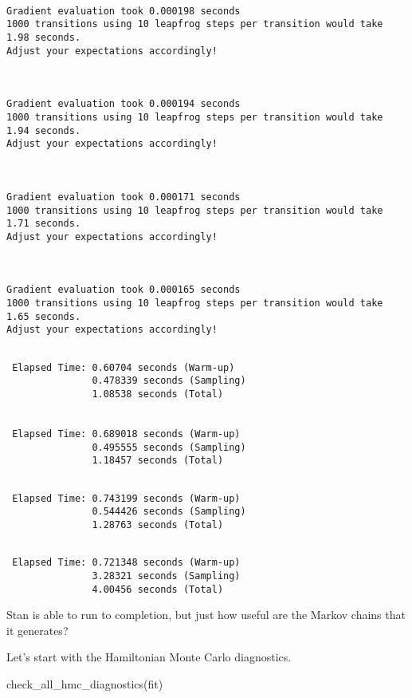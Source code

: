 \documentclass[
  letterpaper,
  DIV=11,
  numbers=noendperiod]{scrartcl}
\newenvironment{Shaded}{\begin{snugshade}}{\end{snugshade}}
\newcommand{\NormalTok}[1]{\textcolor[rgb]{0.00,0.23,0.31}{#1}}
\begin{document}
\begin{verbatim}

Gradient evaluation took 0.000198 seconds
1000 transitions using 10 leapfrog steps per transition would take 1.98 seconds.
Adjust your expectations accordingly!



Gradient evaluation took 0.000194 seconds
1000 transitions using 10 leapfrog steps per transition would take 1.94 seconds.
Adjust your expectations accordingly!



Gradient evaluation took 0.000171 seconds
1000 transitions using 10 leapfrog steps per transition would take 1.71 seconds.
Adjust your expectations accordingly!



Gradient evaluation took 0.000165 seconds
1000 transitions using 10 leapfrog steps per transition would take 1.65 seconds.
Adjust your expectations accordingly!

\end{verbatim}

\begin{verbatim}

 Elapsed Time: 0.60704 seconds (Warm-up)
               0.478339 seconds (Sampling)
               1.08538 seconds (Total)


 Elapsed Time: 0.689018 seconds (Warm-up)
               0.495555 seconds (Sampling)
               1.18457 seconds (Total)
\end{verbatim}

\begin{verbatim}

 Elapsed Time: 0.743199 seconds (Warm-up)
               0.544426 seconds (Sampling)
               1.28763 seconds (Total)
\end{verbatim}

\begin{verbatim}

 Elapsed Time: 0.721348 seconds (Warm-up)
               3.28321 seconds (Sampling)
               4.00456 seconds (Total)
\end{verbatim}

Stan is able to run to completion, but just how useful are the Markov
chains that it generates?

Let's start with the Hamiltonian Monte Carlo diagnostics.

\begin{Shaded}
\begin{Highlighting}[]
\NormalTok{check\_all\_hmc\_diagnostics(fit)}
\end{Highlighting}
\end{Shaded}
\end{document}
